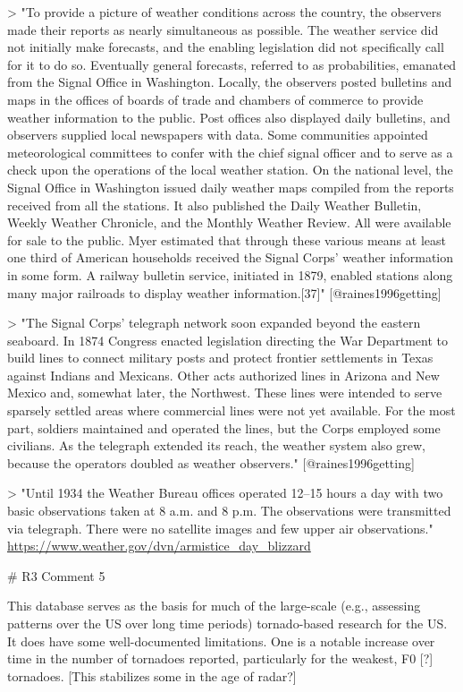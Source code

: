 > "To provide a picture of weather conditions across the country, the observers
made their reports as nearly simultaneous as possible. The weather service did
not initially make forecasts, and the enabling legislation did not specifically
call for it to do so. Eventually general forecasts, referred to as
probabilities, emanated from the Signal Office in Washington. Locally, the
observers posted bulletins and maps in the offices of boards of trade and
chambers of commerce to provide weather information to the public. Post offices
also displayed daily bulletins, and observers supplied local newspapers with
data. Some communities appointed meteorological committees to confer with the
chief signal officer and to serve as a check upon the operations of the local
weather station. On the national level, the Signal Office in Washington issued
daily weather maps compiled from the reports received from all the stations. It
also published the Daily Weather Bulletin, Weekly Weather Chronicle, and the
Monthly Weather Review. All were available for sale to the public. Myer
estimated that through these various means at least one third of American
households received the Signal Corps' weather information in some form. A
railway bulletin service, initiated in 1879, enabled stations along many major
railroads to display weather information.[37]" [@raines1996getting]

> "The Signal Corps' telegraph network soon expanded beyond the eastern
seaboard. In 1874 Congress enacted legislation directing the War Department to
build lines to connect military posts and protect frontier settlements in Texas
against Indians and Mexicans. Other acts authorized lines in Arizona and New
Mexico and, somewhat later, the Northwest. These lines were intended to serve
sparsely settled areas where commercial lines were not yet available. For the
most part, soldiers maintained and operated the lines, but the Corps employed
some civilians. As the telegraph extended its reach, the weather system also
grew, because the operators doubled as weather observers." [@raines1996getting]

> "Until 1934 the Weather Bureau offices operated 12--15 hours a day with two
basic observations taken at 8 a.m. and 8 p.m. The observations were transmitted
via telegraph. There were no satellite images and few upper air observations."
\url{https://www.weather.gov/dvn/armistice_day_blizzard}

# R3 Comment 5

This database serves as the basis for much of the large-scale (e.g., assessing
patterns over the US over long time periods) tornado-based research for the US. 
It does have some well-documented limitations. One is a notable increase over 
time in the number of tornadoes reported, particularly for the weakest, F0 [?]
tornadoes. [This stabilizes some in the age of radar?]

